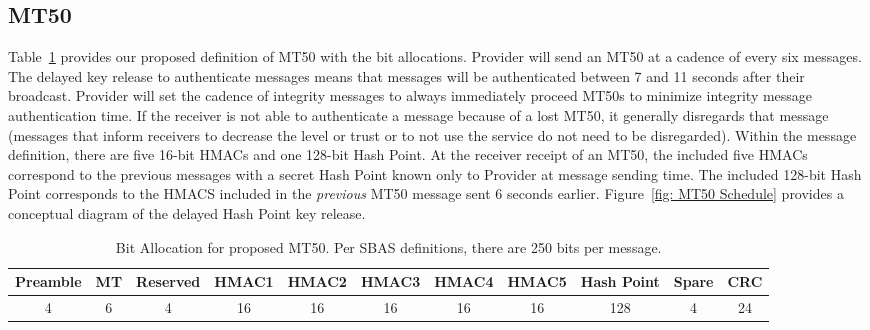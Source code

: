 \documentclass[letterpaper,times]{IONconf/IONconf}
\begin{document}
	\subsection{MT50} \label{sub:mt50}

		Table~\ref{tab: mt50} provides our proposed definition of MT50 with the bit allocations.
		Provider will send an MT50 at a cadence of every six messages.
		The delayed key release to authenticate messages means that messages will be authenticated between 7 and 11 seconds after their broadcast.
		Provider will set the cadence of integrity messages to always immediately proceed MT50s to minimize integrity message authentication time.
		If the receiver is not able to authenticate a message because of a lost MT50, it generally disregards that message (messages that inform receivers to decrease the level or trust or to not use the service do not need to be disregarded).
		Within the message definition, there are five 16-bit HMACs and one 128-bit Hash Point.
		At the receiver receipt of an MT50, the included five HMACs correspond to the previous messages with a secret Hash Point known only to Provider at message sending time.
		The included 128-bit Hash Point corresponds to the HMACS included in the {\em previous} MT50 message sent 6 seconds earlier.
		Figure~\ref{fig: MT50 Schedule} provides a conceptual diagram of the delayed Hash Point key release.

		\begin{table}%
			\center
			\begin{tabular}{|c|c|c|c|c|c|c|c|c|c|c|} \hline
				Preamble & MT & Reserved & HMAC1 & HMAC2 & HMAC3 & HMAC4 & HMAC5 & Hash Point & Spare & CRC \\ \hline
				4 & 6 & 4 & 16 & 16 & 16 & 16 & 16 & 128 & 4 & 24 \\ \hline
			\end{tabular}
			\caption{Bit Allocation for proposed MT50. Per SBAS definitions, there are 250 bits per message.}
			\label{tab: mt50}
		\end{table}
\end{document}
